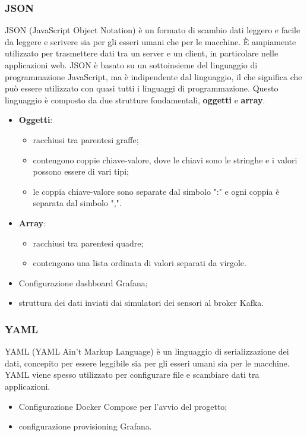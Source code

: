 \subsubsection{JSON}
JSON (JavaScript Object Notation) è un formato di scambio dati leggero e facile da leggere e scrivere sia per gli esseri umani che per le macchine. È ampiamente utilizzato per trasmettere dati tra un server e un client, in particolare nelle applicazioni web. JSON è basato su un sottoinsieme del linguaggio di programmazione JavaScript, ma è indipendente dal linguaggio, il che significa che può essere utilizzato con quasi tutti i linguaggi di programmazione. Questo linguaggio è composto da due strutture fondamentali, \textbf{oggetti} e \textbf{array}.
\begin{itemize}
    \item \textbf{Oggetti}:
	\begin{itemize}
		\item racchiusi tra parentesi graffe;
		\item contengono coppie chiave-valore, dove le chiavi sono le stringhe e i valori possono essere di vari tipi;
		\item le coppia chiave-valore sono separate dal simbolo ":" e ogni coppia è separata dal simbolo ",".
	\end{itemize}
   \item \textbf{Array}:
	\begin{itemize}
		\item racchiusi tra parentesi quadre;
		\item contengono una lista ordinata di valori separati da virgole.
	\end{itemize}
\end{itemize}
\begin{itemize}
	\item Configurazione dashboard Grafana;
	\item struttura dei dati inviati dai simulatori dei sensori al broker Kafka.
\end{itemize}

\subsubsection{YAML}
YAML (YAML Ain't Markup Language) è un linguaggio di serializzazione dei dati, concepito per essere leggibile sia per gli esseri umani sia per le macchine. YAML viene spesso utilizzato per configurare file e scambiare dati tra applicazioni. 
\begin{itemize}
	\item Configurazione Docker Compose per l'avvio del progetto;
	\item configurazione provisioning Grafana.
\end{itemize}
